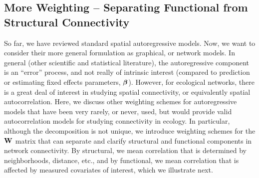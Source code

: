 \documentclass[11pt, titlepage]{article}\usepackage[]{graphicx}\usepackage[]{color}
\begin{document}

\subsection*{More Weighting -- Separating Functional from Structural Connectivity}

So far, we have reviewed standard spatial autoregressive models. Now, we want to consider their more general formulation as graphical, or network models. In general (other scientific and statistical literature), the autoregressive component is an ``error'' process, and not really of intrinsic interest (compared to prediction or estimating fixed effects parameters, $\mbox{\boldmath $\beta$}$).  However, for ecological networks, there is a great deal of interest in studying spatial connectivity, or equivalently spatial autocorrelation.  Here, we discuss other weighting schemes for autoregressive models that have been very rarely, or never, used, but would provide valid autocorrelation models for studying connectivity in ecology.  In particular, although the decomposition is not unique, we introduce weighting schemes for the $\mathbf{W}$ matrix that can separate and clarify structural and functional components in network connectivity.  By structural, we mean correlation that is determined by neighborhoods, distance, etc., and by functional, we mean correlation that is affected by measured covariates of interest, which we illustrate next.
\end{document}
